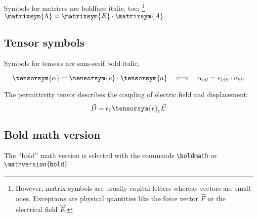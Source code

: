 Symbols for matrices are boldface italic, too:%
\footnote{However, matrix symbols are usually capital letters whereas vectors
are small ones. Exceptions are physical quantities like the force
vector $\vec{F}$ or the electrical field $\vec{E}$.%
}
$\matrixsym{\Lambda}=\matrixsym{E}\cdot\matrixsym{A}.$


\subsection*{Tensor symbols}

Symbols for tensors are sans-serif bold italic,

\[
   \tensorsym{\alpha}  =  \tensorsym{e}\cdot\tensorsym{a}
   \quad \Longleftrightarrow \quad
   \alpha_{ijl}  =  e_{ijk}\cdot a_{kl}.
\]


The permittivity tensor describes the coupling of electric field and
displacement: \[
\vec{D}=\epsilon_{0}\tensorsym{\epsilon}_{\mathrm{r}}\vec{E}\]



\newpage
\subsection*{Bold math version}

The ``bold'' math version is selected with the commands
\verb+\boldmath+ or \verb+\mathversion{bold}+

